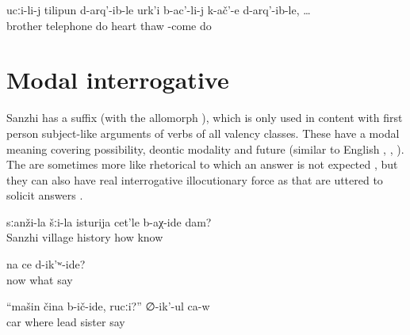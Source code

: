 \begin{exe}
	\ex	\label{ex:When they called the brother}
	\gll	ucːi-li-j	tilipun	d-arq'-ib-le	urk'i	b-ac'-li-j	k-ač'-e	d-arq'-ib-le,	\ldots\\
		brother	telephone	do	heart	thaw		-come	do\\
	\glt	{}
\end{exe}



\section{Modal interrogative}
\label{sec:modalinterrogative}

Sanzhi has a suffix  (with the allomorph ), which is only used in content  with first person subject-like arguments of verbs of all valency classes. These  have a modal meaning covering possibility, deontic modality and future (similar to English , , ). The  are sometimes more like rhetorical  to which an answer is not expected , but they can also have real interrogative illocutionary force as  that are uttered to solicit answers . 

\begin{exe}
	\ex	\label{ex:‎How can I know about the history of Sanzhi}
	\gll	sːanži-la	šːi-la	isturija	cet'le	b-aχ-ide	dam?\\
		Sanzhi	village	history	how	know 	\\
	\glt	{}

	\ex	\label{ex:‎‎Now what can we say}
	\gll	na	ce	d-ik'ʷ-ide?\\
		now	what	say\\
	\glt	{}

	\ex	\label{ex:‎Where should I bring the car, sister}
	\gll	``mašin	čina	b-ič-ide,	rucːi?''		∅-ik'-ul	ca-w\\
		car	where		lead		sister		say	\\
	\glt	{}
\end{exe}

